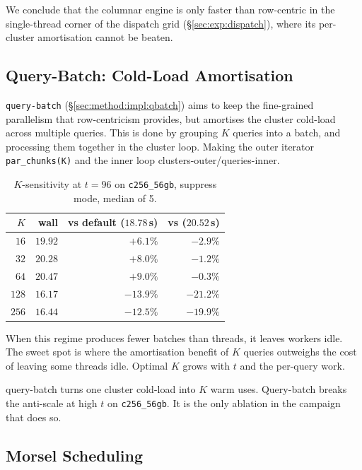 We conclude that the columnar engine is only faster than row-centric in the single-thread corner of the dispatch grid (§\ref{sec:exp:dispatch}), where its per-cluster amortisation cannot be beaten. 

\subsection{Query-Batch: Cold-Load Amortisation\label{sec:exp:wf:qb}}

\texttt{query-batch} (§\ref{sec:method:impl:qbatch}) aims to keep the fine-grained parallelism that row-centricism provides, but amortises the cluster cold-load across multiple queries. This is done by grouping $K$ queries into a batch, and processing them together in the cluster loop. Making the outer iterator \texttt{par\_chunks(K)} and the inner loop clusters-outer/queries-inner.

\begin{table}[H]
  \centering
  \caption[Query-batch $K$-sensitivity.]{$K$-sensitivity at $t{=}96$ on \texttt{c256\_56gb}, suppress mode, median of 5.}
  \label{tab:qb_k}
  \begin{tabular}{rrrr}
    \toprule
    $K$ & wall & vs default ($18.78$\,s) & vs \bcombo{} ($20.52$\,s) \\
    \midrule
    $16$ & $19.92$ & $+6.1\%$ & $-2.9\%$ \\
    $32$ & $20.28$ & $+8.0\%$ & $-1.2\%$ \\
    $64$ & $20.47$ & $+9.0\%$ & $-0.3\%$ \\
    $128$ & $\mathbf{16.17}$ & $\mathbf{-13.9\%}$ & $\mathbf{-21.2\%}$ \\
    $256$ & $16.44$ & $-12.5\%$ & $-19.9\%$ \\
    \bottomrule
  \end{tabular}
\end{table}

When this regime produces fewer batches than threads, it leaves workers idle. The sweet spot is where the amortisation benefit of $K$ queries outweighs the cost of leaving some threads idle.
Optimal $K$ grows with $t$ and the per-query work. 

query-batch turns one cluster cold-load into $K$ warm uses. Query-batch breaks the anti-scale at high $t$ on \texttt{c256\_56gb}. It is the only ablation in the campaign that does so.

\subsection{Morsel Scheduling\label{sec:exp:wf:morsel}}

